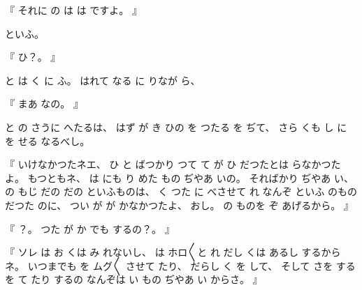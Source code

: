 %
『
それに
の
は
は
ですよ。
』

%
といふ。

%
『
ひ？。
』

%
と
は
く
に
ふ。
%
はれて
なる
に
りなが
ら、

%
『
まあ
なの。
』

%
と
の
さうに
へたるは、
%
はず
が
き
ひの
を
つたる
を
ぢて、
%
さら
くも
し
に
を
せる
なるべし。

%
『
いけなかつたネエ、
%
ひ
と
ばつかり
つて
て
が
ひ
だつたとは
らなかつたよ。
%
もつともネ、
%
は
にも
%
り
めた
もの
ぢやあ
いの。
%
そればかり
ぢやあ
い、
%
の
もじ
だの
だの
といふものは、
%
く
つた
に
べさせて
れ
なんぞ
といふ
のもの
だつた
のに、
%
つい
が
が
かなかつたよ、
%
おし。
%
の
ものを
ぞ
あげるから。
』

%
『
？。
%
つた
が
か
でも
するの？。
』

%
『
ソレ
は%
お
くは
み
れないし、
%
は
ホロ〳〵と
れ
だし
くは
あるし
するからネ。
%
いつまでも
を
ムグ〳〵
させて
たり、
%
だらし
く
を
して、
%
そして
さを
する
を
て
たり
するの
なんぞは
い
もの
ぢやあ
い
からさ。
』

